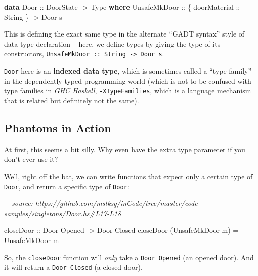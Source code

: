 \documentclass[]{article}
\newenvironment{Shaded}{}{}
\newcommand{\CommentTok}[1]{\textcolor[rgb]{0.38,0.63,0.69}{\textit{#1}}}
\newcommand{\DataTypeTok}[1]{\textcolor[rgb]{0.56,0.13,0.00}{#1}}
\newcommand{\KeywordTok}[1]{\textcolor[rgb]{0.00,0.44,0.13}{\textbf{#1}}}
\newcommand{\NormalTok}[1]{#1}
\newcommand{\OtherTok}[1]{\textcolor[rgb]{0.00,0.44,0.13}{#1}}
\begin{document}
\begin{Shaded}
\begin{Highlighting}[]
\KeywordTok{data} \DataTypeTok{Door}\OtherTok{ ::} \DataTypeTok{DoorState} \OtherTok{{-}>} \DataTypeTok{Type} \KeywordTok{where}
    \DataTypeTok{UnsafeMkDoor}\OtherTok{ ::}\NormalTok{ \{}\OtherTok{ doorMaterial ::} \DataTypeTok{String}\NormalTok{ \} }\OtherTok{{-}>} \DataTypeTok{Door}\NormalTok{ s}
\end{Highlighting}
\end{Shaded}

This is defining the exact same type in the alternate ``GADT syntax'' style of
data type declaration -- here, we define types by giving the type of its
constructors, \texttt{UnsafeMkDoor\ ::\ String\ -\textgreater{}\ Door\ s}.

\texttt{Door} here is an \textbf{indexed data type}, which is sometimes called a
``type family'' in the dependently typed programming world (which is not to be
confused with type families in \emph{GHC Haskell}, \texttt{-XTypeFamilies},
which is a language mechanism that is related but definitely not the same).

\hypertarget{phantoms-in-action}{%
\subsection{Phantoms in Action}\label{phantoms-in-action}}

At first, this seems a bit silly. Why even have the extra type parameter if you
don't ever use it?

Well, right off the bat, we can write functions that expect only a certain type
of \texttt{Door}, and return a specific type of \texttt{Door}:

\begin{Shaded}
\begin{Highlighting}[]
\CommentTok{{-}{-} source: https://github.com/mstksg/inCode/tree/master/code{-}samples/singletons/Door.hs\#L17{-}L18}

\OtherTok{closeDoor ::} \DataTypeTok{Door} \DataTypeTok{\textquotesingle{}Opened} \OtherTok{{-}>} \DataTypeTok{Door} \DataTypeTok{\textquotesingle{}Closed}
\NormalTok{closeDoor (}\DataTypeTok{UnsafeMkDoor}\NormalTok{ m) }\OtherTok{=} \DataTypeTok{UnsafeMkDoor}\NormalTok{ m}
\end{Highlighting}
\end{Shaded}

So, the \texttt{closeDoor} function will \emph{only} take a
\texttt{Door\ \textquotesingle{}Opened} (an opened door). And it will return a
\texttt{Door\ \textquotesingle{}Closed} (a closed door).
\end{document}
